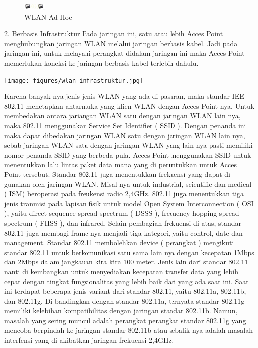 \begin{figure}[ht]
\centerline{\includegraphics[width=0.1\textwidth]{figures/wlan1.jpg}}
\caption{WLAN Ad-Hoc}
\label{wlan}
\end {figure}

2. Berbasis Infrastruktur
Pada jaringan ini, satu atau lebih Acces Point menghubungkan jaringan WLAN melalui
jaringan berbasis kabel. Jadi pada jaringan ini, untuk melayani perangkat didalam
jaringan ini maka Acces Point memerlukan koneksi ke jaringan berbasis kabel terlebih
dahulu.

\begin{figures}[ht]
\centerline{\texttt{[image: figures/wlan-infrastruktur.jpg]}}
\caption{WLAN yang Berbasis Infrastruktur}
\label{wlan-infrastruktur}
\end {figures}

Karena banyak nya jenis jenis WLAN yang ada di pasaran, maka standar IEE 802.11
menetapkan antarmuka yang klien WLAN dengan Acces Point nya. Untuk membedakan
antara jariangan WLAN satu dengan jaringan WLAN lain nya, maka 802.11
menggunakan Service Set Identifier ( SSID ). Dengan penanda ini maka dapat dibedakan
jaringan WLAN satu dengan jaringan WLAN lain nya, sebab jaringan WLAN satu
dengan jaringan WLAN yang lain nya pasti memiliki nomor penanda SSID yang berbeda
pula. Acces Point menggunakan SSID untuk menentukkan lalu lintas paket data mana
yang di peruntukkan untuk Acces Point tersebut.
Standar 802.11 juga menentukkan frekuensi yang dapat di gunakan oleh jaringan WLAN.
Misal nya untuk industrial, scientific dan medical ( ISM) beroperasi pada freukensi radio
2,4GHz. 802.11 juga menentukkan tiga jenis tranmisi pada lapisan fisik untuk model
Open System Interconnection ( OSI ), yaitu direct-sequence spread spectrum ( DSSS ),
frecuency-hopping spread spectrum ( FHSS ), dan infrared. Selain pembagian frekuensi
di atas, standar 802.11 juga membagi frame nya menjadi tiga kategori, yaitu control, date
dan management.
Standar 802.11 membolehkan device ( perangkat ) mengikuti standar 802.11 untuk
berkomunikasi satu sama lain nya dengan kecepatan 1Mbps dan 2Mbps dalam jangkauan
kira kira 100 meter. Jenis lain dari standar 802.11 nanti di kembangkan untuk
menyediakan kecepatan transfer data yang lebih cepat dengan tingkat fungsionalitas yang
lebih baik dari yang ada saat ini. Saat ini terdapat beberapa jenis variant dari standar
802.11, yaitu 802.11a, 802.11b, dan 802.11g.
Di bandingkan dengan standar 802.11a, ternyata standar 802.11g memiliki kelebihan
kompatibilitas dengan jaringan standar 802.11b. Namun, masalah yang sering muncul
adalah perangkat perangkat standar 802.11g yang mencoba berpindah ke jaringan standar
802.11b atau sebalik nya adalah masalah interfensi yang di akibatkan jaringan frekuensi
2,4GHz.

